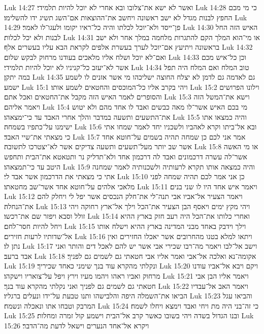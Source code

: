 Luk 14:27  ואשר לא ישא את־צלובו ובא אחרי לא יוכל להיות תלמידי׃
Luk 14:28  כי מי מכם החפץ לבנות מגדל לא ישב ראשונה ויחשב את־ההוצאות אם־השג תשיג ידו להשלימו׃
Luk 14:29  פן־ייסד ולא־יוכל לכלתו והיה כל־ראיו יקומו ולעגו־לו לאמר׃
Luk 14:30  האיש הזה החל לבנות ולא יכל לכלות׃
Luk 14:31  או מי־הוא המלך הקם להתגרות מלחמה במלך אחר ולא ישב בראשונה ויתיעץ אם־יוכל לערך בעשרת אלפים לקראת הבא עליו בעשרים אלף׃
Luk 14:32  ואם־לא יוכל ושלח אליו מלאכים בעודנו מרחוק לבקש שלום׃
Luk 14:33  וכן כל־איש מכם אשר לא־יעזב כל־קניניו לא יוכל להיות תלמידי׃
Luk 14:34  טוב המלח ואם המלח היה תפל במה יתקן׃
Luk 14:35  גם לאדמה גם לדמן לא יצלח החוצה ישליכהו מי אשר אזנים לו לשמע ישמע׃
Luk 15:1  ויהי בקרב אליו כל־המוכסים והחטאים לשמע אותו׃
Luk 15:2  וילונו הפרושים והסופרים לאמר האיש הזה מקבל את־החטאים ואכל אתם׃
Luk 15:3  וישא את־המשל הזה ויאמר אליהם׃
Luk 15:4  מי בכם האיש אשר־לו מאה כבשים ואבד לו אחד מהם ולא יטוש את־התשעים ותשעה במדבר והלך אחרי האבד עד כי־ימצאהו׃
Luk 15:5  והיה כמצאו אתו ישימנו על־כתפיו בשמחה׃
Luk 15:6  ובא אל־ביתו וקרא לאהביו ולשכניו יחד לאמר שמחו אתי כי מצאתי את־שיי האבד׃
Luk 15:7  אמר אני לכם כן שמחה תהיה בשמים על־חוטא אחד אשר שב יותר מעל־תשעים ותשעה צדיקים אשר לא־יצטרכו לתשובה׃
Luk 15:8  או מי האשה אשר־לה עשרה דרכמונים ואבד לה דרכמון אחד ולא־תדליק נר ותטאטא את־הבית ותחפש היטב עד כי־תמצאהו׃
Luk 15:9  והיה כמצאה אותו תקרא לרעותיה ולשכנותיה לאמר שמחנה אתי כי מצאתי את הדרכמון אשר אבד לי׃
Luk 15:10  כן אני אמר לכם תהיה שמחה לפני מלאכי אלהים על־חוטא אחד אשר־שב מחטאתו׃
Luk 15:11  ויאמר איש אחד היו לו שני בנים׃
Luk 15:12  ויאמר הצעיר אל־אביו אבי תנה־לי את־חלק הנכסים אשר יפל לי ויחלק להם את־הנחלה׃
Luk 15:13  ויהי מקץ ימים ויאסף הבן הצעיר את־הכל וילך אל־ארץ רחוקה ויהי זולל וסבא ויפזר שם את־רכשו׃
Luk 15:14  ואחרי כלותו את־הכל היה רעב חזק בארץ ההיא ויחל להיות חסר־לחם׃
Luk 15:15  וילך וידבק באחד מבני המדינה בארץ ההיא וישלח אותו אל־שדותיו לרעות חזירים׃
Luk 15:16  ויתאו למלא בטנו מהחרובים אשר יאכלו החזירים ואין נתן לו׃
Luk 15:17  וישב אל־לבו ויאמר מה־רבו שכירי אבי אשר יש להם לאכל דים והותר ואני אבד ברעב׃
Luk 15:18  אקומה־נא ואלכה אל־אבי ואמר אליו אבי חטאתי גם לשמים גם לפניך׃
Luk 15:19  ונקלתי מהקרא עוד בנך שימני כאחד שכיריך׃
Luk 15:20  ויקם ויבא אל־אביו עודנו מרחוק ואביו ראהו ויהמו מעיו וירץ ויפל על־צואריו וישקהו׃
Luk 15:21  ויאמר אליו הבן אבי חטאתי גם לשמים גם לפניך ואני נקלתי מהקרא עוד בנך׃
Luk 15:22  ויאמר האב אל־עבדיו הביאו את־השמלה היפה והלבישהו ותנו טבעת על־ידו ונעלים ברגליו׃
Luk 15:23  והביאו עגל המרבק וטבחו אתו ונאכלה ונשמח׃
Luk 15:24  כי זה־בני היה מת ויחי ואבד וימצא ויחלו לשמח׃
Luk 15:25  ובנו הגדול בשדה ויהי בשובו כאשר קרב אל־הבית וישמע קול זמרה ומחלות׃
Luk 15:26  ויקרא אל־אחד הנערים וישאל לדעת מה־הדבר׃
